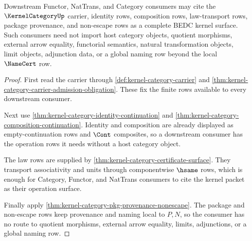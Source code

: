 \begin{theorem}
\label{thm:kernel-category-downstream-consumer-readiness}
Downstream Functor, NatTrans, and Category consumers may cite the
$\KernelCategoryUp$ carrier, identity rows, composition rows, law-transport
rows, package provenance, and non-escape rows as a complete BEDC kernel
surface. Such consumers need not import host category objects, quotient
morphisms, external arrow equality, functorial semantics, natural
transformation objects, limit objects, adjunction data, or a global naming
row beyond the local $\NameCert$ row.
\end{theorem}
\begin{proof}
First read the carrier through \autoref{def:kernel-category-carrier} and
\autoref{thm:kernel-category-carrier-admission-obligation}. These fix the
finite rows available to every downstream consumer.

Next use \autoref{thm:kernel-category-identity-continuation} and
\autoref{thm:kernel-category-composition-continuation}. Identity and
composition are already displayed as empty-continuation rows and $\Cont$
composites, so a downstream consumer has the operation rows it needs without a
host category object.

The law rows are supplied by \autoref{thm:kernel-category-certificate-surface}.
They transport associativity and units through componentwise $\hsame$ rows,
which is enough for Category, Functor, and NatTrans consumers to cite the
kernel packet as their operation surface.

Finally apply \autoref{thm:kernel-category-pkg-provenance-nonescape}. The
package and non-escape rows keep provenance and naming local to $P,N$, so the
consumer has no route to quotient morphisms, external arrow equality, limits,
adjunctions, or a global naming row.
\end{proof}

